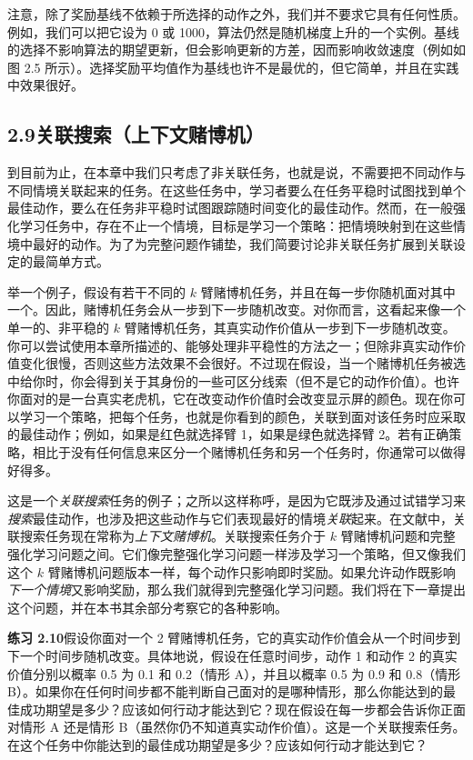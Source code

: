 \documentclass[UTF8,12pt,a4paper,fontset=fandol]{ctexart}
\begin{document}
注意，除了奖励基线不依赖于所选择的动作之外，我们并不要求它具有任何性质。例如，我们可以把它设为 0 或 1000，算法仍然是随机梯度上升的一个实例。基线的选择不影响算法的期望更新，但会影响更新的方差，因而影响收敛速度（例如如图 2.5 所示）。选择奖励平均值作为基线也许不是最优的，但它简单，并且在实践中效果很好。

\subsection*{2.9\quad 关联搜索（上下文赌博机）}

到目前为止，在本章中我们只考虑了非关联任务，也就是说，不需要把不同动作与不同情境关联起来的任务。在这些任务中，学习者要么在任务平稳时试图找到单个最佳动作，要么在任务非平稳时试图跟踪随时间变化的最佳动作。然而，在一般强化学习任务中，存在不止一个情境，目标是学习一个策略：把情境映射到在这些情境中最好的动作。为了为完整问题作铺垫，我们简要讨论非关联任务扩展到关联设定的最简单方式。

举一个例子，假设有若干不同的 $k$ 臂赌博机任务，并且在每一步你随机面对其中一个。因此，赌博机任务会从一步到下一步随机改变。对你而言，这看起来像一个单一的、非平稳的 $k$ 臂赌博机任务，其真实动作价值从一步到下一步随机改变。你可以尝试使用本章所描述的、能够处理非平稳性的方法之一；但除非真实动作价值变化很慢，否则这些方法效果不会很好。不过现在假设，当一个赌博机任务被选中给你时，你会得到关于其身份的一些可区分线索（但不是它的动作价值）。也许你面对的是一台真实老虎机，它在改变动作价值时会改变显示屏的颜色。现在你可以学习一个策略，把每个任务，也就是你看到的颜色，关联到面对该任务时应采取的最佳动作；例如，如果是红色就选择臂 1，如果是绿色就选择臂 2。若有正确策略，相比于没有任何信息来区分一个赌博机任务和另一个任务时，你通常可以做得好得多。

这是一个\textit{关联搜索}任务的例子；之所以这样称呼，是因为它既涉及通过试错学习来\textit{搜索}最佳动作，也涉及把这些动作与它们表现最好的情境\textit{关联}起来。在文献中，关联搜索任务现在常称为\textit{上下文赌博机}。关联搜索任务介于 $k$ 臂赌博机问题和完整强化学习问题之间。它们像完整强化学习问题一样涉及学习一个策略，但又像我们这个 $k$ 臂赌博机问题版本一样，每个动作只影响即时奖励。如果允许动作既影响\textit{下一个情境}又影响奖励，那么我们就得到完整强化学习问题。我们将在下一章提出这个问题，并在本书其余部分考察它的各种影响。

\noindent\textbf{练习 2.10}\quad 假设你面对一个 2 臂赌博机任务，它的真实动作价值会从一个时间步到下一个时间步随机改变。具体地说，假设在任意时间步，动作 1 和动作 2 的真实价值分别以概率 0.5 为 0.1 和 0.2（情形 A），并且以概率 0.5 为 0.9 和 0.8（情形 B）。如果你在任何时间步都不能判断自己面对的是哪种情形，那么你能达到的最佳成功期望是多少？应该如何行动才能达到它？现在假设在每一步都会告诉你正面对情形 A 还是情形 B（虽然你仍不知道真实动作价值）。这是一个关联搜索任务。在这个任务中你能达到的最佳成功期望是多少？应该如何行动才能达到它？
\end{document}
